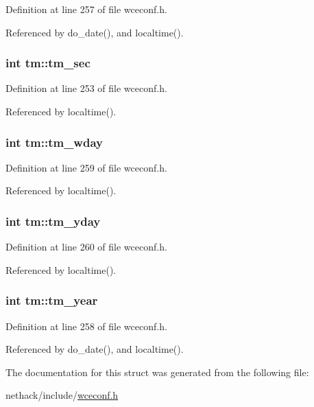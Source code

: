 Definition at line 257 of file wceconf.\+h.



Referenced by do\+\_\+date(), and localtime().

\hypertarget{structtm_a4d098a9a5c03a00b2ee61e10851de81e}{
\subsubsection[{tm\+\_\+sec}]{\setlength{\rightskip}{0pt plus 5cm}int tm\+::tm\+\_\+sec}}\label{structtm_a4d098a9a5c03a00b2ee61e10851de81e}


Definition at line 253 of file wceconf.\+h.



Referenced by localtime().

\hypertarget{structtm_afe81a8c46f1c693c43f259b288859f4f}{
\subsubsection[{tm\+\_\+wday}]{\setlength{\rightskip}{0pt plus 5cm}int tm\+::tm\+\_\+wday}}\label{structtm_afe81a8c46f1c693c43f259b288859f4f}


Definition at line 259 of file wceconf.\+h.



Referenced by localtime().

\hypertarget{structtm_a93a0ba77cc23796df84405dcbcc57eb1}{
\subsubsection[{tm\+\_\+yday}]{\setlength{\rightskip}{0pt plus 5cm}int tm\+::tm\+\_\+yday}}\label{structtm_a93a0ba77cc23796df84405dcbcc57eb1}


Definition at line 260 of file wceconf.\+h.



Referenced by localtime().

\hypertarget{structtm_a33adf78fd6476b2120ce3b9c4a852053}{
\subsubsection[{tm\+\_\+year}]{\setlength{\rightskip}{0pt plus 5cm}int tm\+::tm\+\_\+year}}\label{structtm_a33adf78fd6476b2120ce3b9c4a852053}


Definition at line 258 of file wceconf.\+h.



Referenced by do\+\_\+date(), and localtime().



The documentation for this struct was generated from the following file\+:\begin{DoxyCompactItemize}
\item 
nethack/include/\hyperlink{wceconf_8h}{wceconf.\+h}\end{DoxyCompactItemize}
